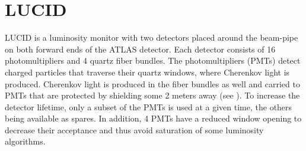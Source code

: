 %    
%   
%  
% 

\section{LUCID}
\label{sec:LUCID}
LUCID is a luminosity monitor with two detectors placed around the beam-pipe on both forward ends of the ATLAS detector. 
Each detector consists of 16 photomultipliers and 4 quartz fiber bundles. The photomultipliers (PMTs) detect charged 
particles that traverse their quartz windows, where Cherenkov light is produced. Cherenkov light is produced in 
the fiber bundles as well and carried to PMTs that are protected by shielding some 2 meters away 
(see ). To increase the detector lifetime, only a subset of the PMTs is used at a 
given time, the others being available as spares. In addition, 4 PMTs have a reduced window opening to decrease 
their acceptance and thus avoid saturation of some luminosity algorithms.

